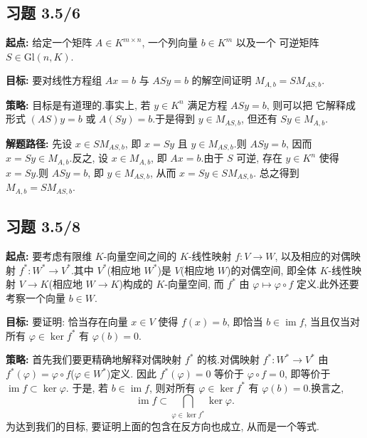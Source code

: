 \subsection*{习题 3.5/6}

\noindent\textbf{起点:} 给定一个矩阵 $A \in K^{m \times n}$, 一个列向量 $b \in K^m$ 以及一个
可逆矩阵 $S \in \mathrm{Gl}(n, K)$.

\noindent\textbf{目标:} 要对线性方程组 $Ax = b$ 与 $ASy = b$ 的解空间证明
$M_{A, b} = SM_{AS, b}$.

\noindent\textbf{策略:} 目标是有道理的.事实上, 若 $y \in K^n$ 满足方程 $ASy = b$, 则可以把
它解释成形式 $(AS)y = b$ 或 $A(Sy) = b$.于是得到 $y \in M_{AS, b}$, 但还有
$Sy \in M_{A, b}$.

\noindent\textbf{解题路径:} 先设 $x \in SM_{AS, b}$, 即 $x = Sy$ 且 $y \in M_{AS, b}$.则
$ASy = b$, 因而 $x = Sy \in M_{A, b}$.反之, 设 $x \in M_{A, b}$, 即 $Ax = b$.由于 $S$ 可逆,
存在 $y \in K^n$ 使得 $x = Sy$.则 $ASy = b$, 即 $y \in M_{AS, b}$, 从而 $x = Sy \in SM_{AS, b}$.
总之得到 $M_{A, b} = SM_{AS, b}$.

\subsection*{习题 3.5/8}

\noindent\textbf{起点:} 要考虑有限维 $K$-向量空间之间的 $K$-线性映射
$f \colon V \longrightarrow W$, 以及相应的对偶映射 $f^* \colon W^* \longrightarrow V^*$.其中
$V^*$(相应地 $W^*$)是 $V$(相应地 $W$)的对偶空间, 即全体 $K$-线性映射
$V \longrightarrow K$(相应地 $W \longrightarrow K$)构成的 $K$-向量空间, 而 $f^*$ 由
$\varphi \longmapsto \varphi \circ f$ 定义.此外还要考察一个向量 $b \in W$.

\noindent\textbf{目标:} 要证明: 恰当存在向量 $x \in V$ 使得 $f(x) = b$, 即恰当 $b \in \operatorname{im} f$,
当且仅当对所有 $\varphi \in \ker f^*$ 有 $\varphi(b) = 0$.

\noindent\textbf{策略:} 首先我们要更精确地解释对偶映射 $f^*$ 的核.对偶映射
$f^* \colon W^* \longrightarrow V^*$ 由 $f^*(\varphi) = \varphi \circ f$($\varphi \in W^*$)定义.
因此 $f^*(\varphi) = 0$ 等价于 $\varphi \circ f = 0$, 即等价于 $\operatorname{im} f \subset \ker \varphi$.
于是, 若 $b \in \operatorname{im} f$, 则对所有 $\varphi \in \ker f^*$ 有 $\varphi(b) = 0$.换言之,
\begin{equation}
\operatorname{im} f \subset \bigcap_{\varphi \in \ker f^*} \ker \varphi\text{.} \tag{$*$}
\end{equation}
为达到我们的目标, 要证明上面的包含在反方向也成立, 从而是一个等式.

